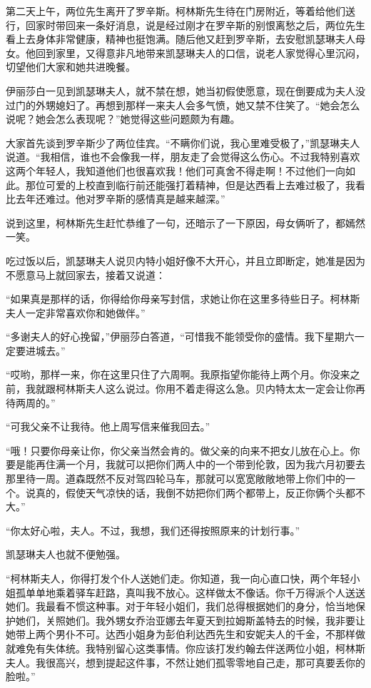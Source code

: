 \par 第二天上午，两位先生离开了罗辛斯。柯林斯先生待在门房附近，等着给他们送行，回家时带回来一条好消息，说是经过刚才在罗辛斯的别恨离愁之后，两位先生看上去身体非常健康，精神也挺饱满。随后他又赶到罗辛斯，去安慰凯瑟琳夫人母女。他回到家里，又得意非凡地带来凯瑟琳夫人的口信，说老人家觉得心里沉闷，切望他们大家和她共进晚餐。
\par 伊丽莎白一见到凯瑟琳夫人，就不禁在想，她当初假使愿意，现在倒要成为夫人没过门的外甥媳妇了。再想到那样一来夫人会多气愤，她又禁不住笑了。“她会怎么说呢？她会怎么表现呢？”她觉得这些问题颇为有趣。
\par 大家首先谈到罗辛斯少了两位佳宾。“不瞒你们说，我心里难受极了，”凯瑟琳夫人说道。“我相信，谁也不会像我一样，朋友走了会觉得这么伤心。不过我特别喜欢这两个年轻人，我知道他们也很喜欢我！他们可真舍不得走啊！不过他们一向如此。那位可爱的上校直到临行前还能强打着精神，但是达西看上去难过极了，我看比去年还难过。他对罗辛斯的感情真是越来越深。”
\par 说到这里，柯林斯先生赶忙恭维了一句，还暗示了一下原因，母女俩听了，都嫣然一笑。
\par 吃过饭以后，凯瑟琳夫人说贝内特小姐好像不大开心，并且立即断定，她准是因为不愿意马上就回家去，接着又说道：
\par “如果真是那样的话，你得给你母亲写封信，求她让你在这里多待些日子。柯林斯夫人一定非常喜欢你和她做伴。”
\par “多谢夫人的好心挽留，”伊丽莎白答道，“可惜我不能领受你的盛情。我下星期六一定要进城去。”
\par “哎哟，那样一来，你在这里只住了六周啊。我原指望你能待上两个月。你没来之前，我就跟柯林斯夫人这么说过。你用不着走得这么急。贝内特太太一定会让你再待两周的。”
\par “可我父亲不让我待。他上周写信来催我回去。”
\par “哦！只要你母亲让你，你父亲当然会肯的。做父亲的向来不把女儿放在心上。你要是能再住满一个月，我就可以把你们两人中的一个带到伦敦，因为我六月初要去那里待一周。道森既然不反对驾四轮马车，那就可以宽宽敞敞地带上你们中的一个。说真的，假使天气凉快的话，我倒不妨把你们两个都带上，反正你俩个头都不大。”
\par “你太好心啦，夫人。不过，我想，我们还得按照原来的计划行事。”
\par 凯瑟琳夫人也就不便勉强。
\par “柯林斯夫人，你得打发个仆人送她们走。你知道，我一向心直口快，两个年轻小姐孤单单地乘着驿车赶路，真叫我不放心。这样做太不像话。你千万得派个人送送她们。我最看不惯这种事。对于年轻小姐们，我们总得根据她们的身分，恰当地保护她们，关照她们。我外甥女乔治亚娜去年夏天到拉姆斯盖特去的时候，我非要让她带上两个男仆不可。达西小姐身为彭伯利达西先生和安妮夫人的千金，不那样做就难免有失体统。我特别留心这类事情。你应该打发约翰去伴送两位小姐，柯林斯夫人。我很高兴，想到提起这件事，不然让她们孤零零地自己走，那可真要丢你的脸啦。”

